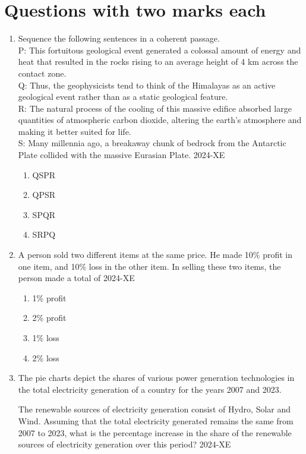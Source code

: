 \documentclass[journal,12pt,onecolumn]{IEEEtran}
\theoremstyle{remark}
\begin{document}
\section{Questions with two marks each}
\begin{enumerate}
\item Sequence the following sentences in a coherent passage.\\
	P: This fortuitous geological event generated a colossal amount of energy and heat that resulted in the rocks rising to an average height of 4 km across the contact zone. \\
	Q: Thus, the geophysicists tend to think of the Himalayas as an active geological event rather than as a static geological feature.\\
	R: The natural process of the cooling of this massive edifice absorbed large quantities of atmospheric carbon dioxide, altering the earth's atmosphere and making it better suited for life. \\
	S: Many millennia ago, a breakaway chunk of bedrock from the Antarctic Plate collided with the massive Eurasian Plate. 
\hfill{2024-XE}

	\begin{enumerate}
		\item QSPR
		\item QPSR
		\item SPQR
		\item SRPQ
	\end{enumerate}

\item A person sold two different items at the same price. He made 10\% profit in one item, and 10\% loss in the other item. In selling these two items, the person made a total of
\hfill{2024-XE}

	\begin{enumerate}
		\item 1\% profit
		\item 2\% profit
		\item 1\% loss
		\item 2\% loss
	\end{enumerate}

\item The pie charts depict the shares of various power generation technologies in the total electricity generation of a country for the years 2007 and 2023. \\
	\begin{figure}[ht]
		\centering
		
	\end{figure}
The renewable sources of electricity generation consist of Hydro, Solar and Wind. Assuming that the total electricity generated remains the same from 2007 to 2023, what is the percentage increase in the share of the renewable sources of electricity generation over this period?
\hfill{2024-XE}


\end{enumerate}
\end{document}
